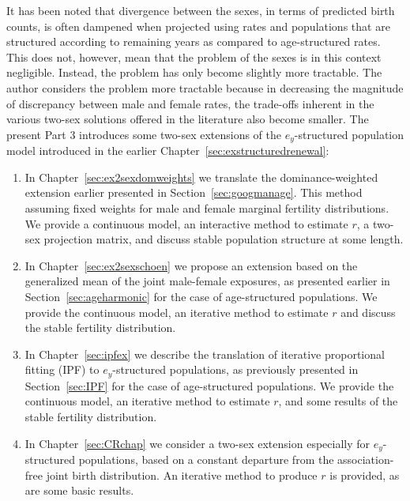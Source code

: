  \FloatBarrier
\label{Chapter:ex2sex}
It has been noted that divergence between the sexes, in terms of predicted birth
counts, is often dampened when projected using rates and populations that are
structured according to remaining years as compared to age-structured rates.
This does not, however, mean that the problem of the sexes is in this context
 negligible. Instead, the problem has
only become slightly more tractable. The author considers the problem more
tractable because in decreasing the magnitude of discrepancy between male and female
rates, the trade-offs inherent in the various two-sex solutions offered in the
literature also become smaller. The present Part 3 introduces some two-sex
extensions of the $e_y$-structured population model introduced in the earlier
Chapter~\ref{sec:exstructuredrenewal}:
\begin{enumerate}
  \item In Chapter~\ref{sec:ex2sexdomweights} we
  translate the dominance-weighted extension earlier presented in
  Section~\ref{sec:googmanage}. This method assuming fixed weights for male and
  female marginal fertility distributions. We provide a continuous model, an
  interactive method to estimate $r$, a two-sex projection matrix, and discuss
  stable population structure at some length.
  \item In Chapter~\ref{sec:ex2sexschoen} we propose an extension based on the
  generalized mean of the joint male-female exposures, as presented earlier in
  Section~\ref{sec:ageharmonic} for the case of age-structured populations. We
  provide the continuous model, an iterative method to estimate $r$ and discuss
  the stable fertility distribution.
  \item In Chapter~\ref{sec:ipfex} we describe the translation of iterative
  proportional fitting (IPF) to $e_y$-structured populations, as previously
  presented in Section~\ref{sec:IPF} for the case of age-structured populations.
  We provide the continuous model, an iterative method to estimate $r$, and some
  results of the stable fertility distribution.
  \item In Chapter~\ref{sec:CRchap} we consider a two-sex extension
  especially for $e_y$-structured populations, based on a constant departure
  from the association-free joint birth distribution. An iterative method to
  produce $r$ is provided, as are some basic results.
\end{enumerate}